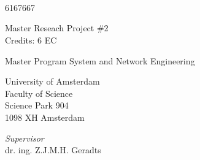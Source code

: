 
\begin{titlepage}

\begin{addmargin}[-1cm]{-3cm}
\begin{center}
\large

\hfill
\vfill

\begingroup
\begin{huge}
\color{Maroon}\spacedallcaps{\myTitle} \\ \medskip %
\end{huge}
\begin{Large}
\spacedlowsmallcaps{\mySubtitle}\\ \medskip %
\end{Large}

\endgroup
\bigskip

\vspace{1.5cm}
\bigskip

\\
6167667

\vspace{1.5cm}

Master Reseach Project \#2\\
Credits: 6 EC

\vspace{0.5cm}

Master Program System and Network Engineering

\vspace{0.25cm}

University of Amsterdam\\
Faculty of Science\\
Science Park 904\\
1098 XH Amsterdam

\vspace{2cm}

\emph{Supervisor}\\
dr. ing. Z.J.M.H. Geradts


\end{center}
\end{addmargin}
\end{titlepage}
